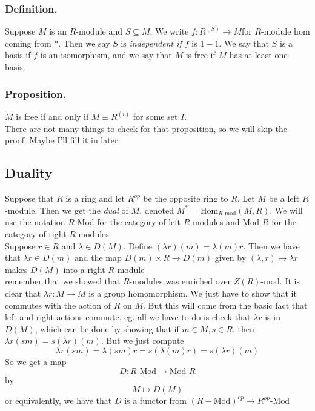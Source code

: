 \documentclass{article}
\newcommand{\vs}{\bigskip\\\text{}}
\begin{document}
\subsubsection{Definition.} Suppose $M$ is an $R$-module and $S \subseteq M$. We
write $f: R^{(S)} \to M$for $R$-module hom coming from $*$. Then we say $S$ is
\textit{independent if $f$} is $1-1$. We say that $S$ is a basis if $f$ is an
isomorphism, and we say that $M$ is free if $M$ has at least one basis.
\subsubsection{Proposition.} $M$ is free if and only if $M \equiv R^{(i)}$ for
some set $I$.\vs
There are not many things to check for that proposition, so we will skip the
proof. Maybe I'll fill it in later.\vs
\subsection{Duality}
Suppose that $R$ is a ring and let $R^{op}$ be the opposite ring to $R$. Let $M$
be a left $R$-module. Then we get the \textit{dual} of $M$, denoted $M^*$ =
$\text{Hom}_{\text{$R$-mod}}(M,R)$. We will use the notation $R$-Mod for the
category of left $R$-modules and Mod-$R$ for the category of right
$R$-modules.\vs
%
Suppose $r\in R$ and $\lambda \in D(M)$. Define $(\lambda r) (m) = \lambda(m)r$.
Then we have that $\lambda r \in D(m)$ and the map $D(m) \times R \to D(m)$
given by $(\lambda, r) \mapsto \lambda r$ makes $D(M)$ into a right
$R$-module\vs
remember that we showed that $R$-modules was enriched over $Z(R)$-mod. It is
clear that $\lambda r: M \to M$ is a group homomorphism. We just have to show
that it commutes with the action of $R$ on $M$. But this will come from the
basic fact that left and right actions commute. eg. all we have to do is check
that $\lambda r$ is in $D(M)$, which can be done by showing that if $m \in M,
s \in R$, then $\lambda r (sm) = s (\lambda r)(m)$. But we just compute 
\[ \lambda r (sm) = \lambda(sm)r = s(\lambda(m)r) = s(\lambda r)(m)\]
So we get a map
\[ D: \text{$R$-Mod} \to \text{Mod-$R$}\]
by 
\[ M \mapsto D(M)\]
or equivalently, we have that $D$ is a functor from $(R-\text{Mod})^{op} \to
\text{$R^{op}$-Mod}$
\end{document}

